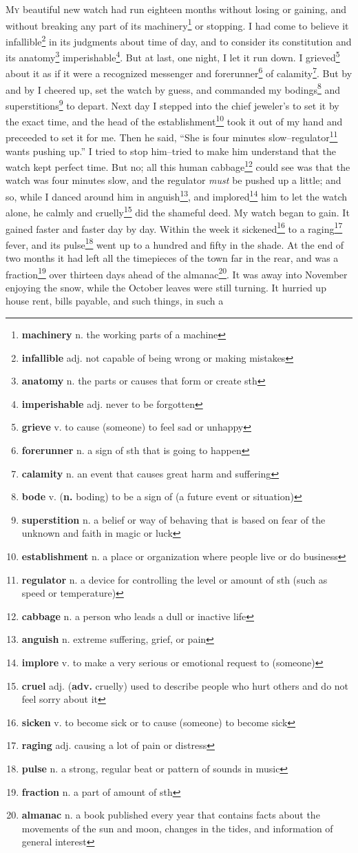 \lettrine{M}{y} beautiful new watch had run eighteen months without losing or gaining, and without breaking any part of its machinery\footnote{\textbf{machinery} n. the working parts of a machine} or stopping. I had come to believe it infallible\footnote{\textbf{infallible} adj. not capable of being wrong or making mistakes} in its judgments about time of day, and to consider its constitution and its anatomy\footnote{\textbf{anatomy} n. the parts or causes that form or create sth} imperishable\footnote{\textbf{imperishable} adj. never to be forgotten}. But at last, one night, I let it run down. I grieved\footnote{\textbf{grieve} v. to cause (someone) to feel sad or unhappy} about it as if it were a recognized messenger and forerunner\footnote{\textbf{forerunner} n. a sign of sth that is going to happen} of calamity\footnote{\textbf{calamity} n. an event that causes great harm and suffering}. But by and by I cheered up, set the watch by guess, and commanded my bodings\footnote{\textbf{bode} v. (\textbf{n.} boding) to be a sign of (a future event or situation)} and superstitions\footnote{\textbf{superstition} n. a belief or way of behaving that is based on fear of the unknown and faith in magic or luck} to depart. Next day I stepped into the chief jeweler's to set it by the exact time, and the head of the establishment\footnote{\textbf{establishment} n. a place or organization where people live or do business} took it out of my hand and preceeded to set it for me. Then he said, ``She is four minutes slow--regulator\footnote{\textbf{regulator} n. a device for controlling the level or amount of sth (such as speed or temperature)} wants pushing up.'' I tried to stop him--tried to make him understand that the watch kept perfect time. But no; all this human cabbage\footnote{\textbf{cabbage} n. a person who leads a dull or inactive life} could see was that the watch was four minutes slow, and the regulator \textit{must} be pushed up a little; and so, while I danced around him in anguish\footnote{\textbf{anguish} n. extreme suffering, grief, or pain}, and implored\footnote{\textbf{implore} v. to make a very serious or emotional request to (someone)} him to let the watch alone, he calmly and cruelly\footnote{\textbf{cruel} adj. (\textbf{adv.} cruelly) used to describe people who hurt others and do not feel sorry about it} did the shameful deed. My watch began to gain. It gained faster and faster day by day. Within the week it sickened\footnote{\textbf{sicken} v. to become sick or to cause (someone) to become sick} to a raging\footnote{\textbf{raging} adj. causing a lot of pain or distress} fever, and its pulse\footnote{\textbf{pulse} n. a strong, regular beat or pattern of sounds in music} went up to a hundred and fifty in the shade. At the end of two months it had left all the timepieces of the town far in the rear, and was a fraction\footnote{\textbf{fraction} n. a part of amount of sth} over thirteen days ahead of the almanac\footnote{\textbf{almanac} n. a book published every year that contains facts about the movements of the sun and moon, changes in the tides, and information of general interest}. It was away into November enjoying the snow, while the October leaves were still turning. It hurried up house rent, bills payable, and such things, in such a 